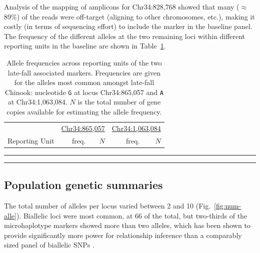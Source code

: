Analysis of the mapping of amplicons for Chr34:828,768 
showed that many ($\approx$89\%) of the reads were off-target (aligning to other chromosomes, 
etc.), making it costly (in terms of sequencing effort) to include the marker in the baseline panel. 
  The frequency of the different alleles at the two remaining loci
within different reporting units in the baseline are shown in Table~\ref{tab:lfar-freqs}.
\begin{table}
\caption{\footnotesize Allele frequencies across reporting units of the two late-fall associated
markers.  Frequencies are given for the alleles most common amongst late-fall Chinook: nucleotide 
{\tt G} at locus Chr34:865,057 and {\tt A} at Chr34:1,063,084.  $N$ is the total number of gene 
copies available for estimating the allele frequency.}
\label{tab:lfar-freqs}
{\footnotesize
\begin{tabular*}{\columnwidth}{@{\extracolsep{\fill}} lrrrr}
\hline\hline
& \multicolumn{2}{c}{\underline{Chr34:865,057}} & \multicolumn{2}{c}{\underline{Chr34:1,063,084}} \\
Reporting Unit & freq. & $N$ & freq. & $N$ \\ \hline

\end{tabular*}
}
\vspace*{-2.3ex}\hrule\vspace*{0.3ex}\hrule
\end{table}
\subsection*{Population genetic summaries}

The total number of alleles per locus varied between 2 and 10 (Fig.~\ref{fig:num-alle}). Biallelic 
loci were most common, at 66 of the total, but two-thirds of the microhaplotype markers
showed more than two alleles, which has been shown to provide significantly more
power for relationship inference than a comparably sized panel of biallelic SNPs
\citep{baetscher2018microhaplotypes}.


